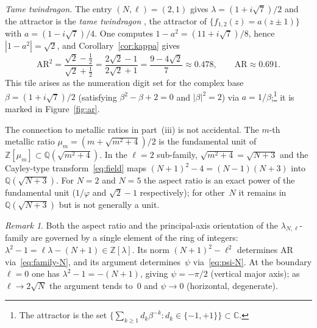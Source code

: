 \documentclass{amsart}
\theoremstyle{definition}
\theoremstyle{remark}
\newtheorem{remark}[theorem]{Remark}
\begin{document}
\textit{Tame twindragon.}
The entry $(N,\ell)=(2,1)$ gives $\lambda=(1+i\sqrt{7})/2$
and the attractor is the
\emph{tame twindragon} \cite[p.~550]{Bandt1991}, the attractor of $\{f_{1,2}(z)=a(z\pm 1)\}$
with $a=(1-i\sqrt{7})/4$.
One computes $1-a^2=(11+i\sqrt{7})/8$, hence $|1-a^2|=\sqrt{2}$, and
Corollary~\ref{cor:kappa} gives
\[
  \mathrm{AR}^2 = \frac{\sqrt{2}-\tfrac{1}{2}}{\sqrt{2}+\tfrac{1}{2}}
               = \frac{2\sqrt{2}-1}{2\sqrt{2}+1}
               = \frac{9-4\sqrt{2}}{7}
               \approx 0.478,
  \qquad
  \mathrm{AR} \approx 0.691.
\]
This tile arises as the numeration digit set for
the complex base $\beta=(1+i\sqrt{7})/2$
(satisfying $\beta^2-\beta+2=0$ and $|\beta|^2=2$)
via $a=1/\beta$;\footnote{The attractor is the set
$\bigl\{\sum_{k\geq 1}d_k\beta^{-k}:d_k\in\{-1,+1\}\bigr\}\subset\mathbb{C}$.}
it is marked in Figure~\ref{fig:ar}.

The connection to metallic ratios in part~(iii) is not accidental.
The $m$-th metallic ratio $\mu_m = (m+\sqrt{m^2+4})/2$ is the
fundamental unit of $\mathbb{Z}[\mu_m]
\subset\mathbb{Q}(\sqrt{m^2+4})$.
In the $\ell=2$ sub-family, $\sqrt{m^2+4} = \sqrt{N+3}$
and the Cayley-type transform~\eqref{eq:field} maps
$(N\!+\!1)^2-4 = (N\!-\!1)(N\!+\!3)$ into $\mathbb{Q}(\sqrt{N+3})$.
For $N=2$ and $N=5$ the aspect ratio is an exact power of the
fundamental unit ($1/\varphi$ and $\sqrt{2}-1$ respectively);
for other~$N$ it remains in $\mathbb{Q}(\sqrt{N+3})$ but is not
generally a unit.

\begin{remark}
Both the aspect ratio and the principal-axis orientation of the
$\lambda_{N,\ell}$-family are governed by a single element of the
ring of integers: $\lambda^2-1 = \ell\lambda-(N\!+\!1) \in \mathbb{Z}[\lambda]$.
Its norm $(N\!+\!1)^2-\ell^2$ determines $\mathrm{AR}$
via~\eqref{eq:family-N}, and its argument determines~$\psi$
via~\eqref{eq:psi-N}.
At the boundary $\ell=0$ one has $\lambda^2-1 = -(N\!+\!1)$,
giving $\psi = -\pi/2$ (vertical major axis);
as $\ell\to 2\sqrt{N}$ the argument tends to~$0$ and
$\psi\to 0$ (horizontal, degenerate).
\end{remark}
\end{document}
